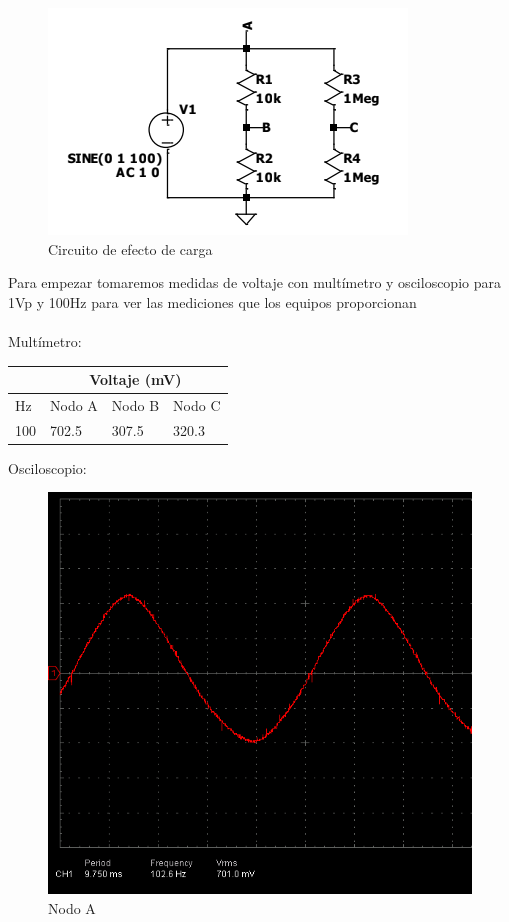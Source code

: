 \begin{figure}[H]
    \centering
    \includegraphics[scale=0.65]{img/circ/Circuito para efecto de carga.png}
    \caption{Circuito de efecto de carga}
    \label{Circuito de efecto de carga}
\end{figure}

Para empezar tomaremos medidas de voltaje con multímetro y osciloscopio para 1Vp y 100Hz para ver las mediciones que los equipos proporcionan
\\
\\
Multímetro:
\begin{table}[H]
\centering
\begin{tabular}{l|cll|}
\cline{2-4}
                          & \multicolumn{3}{c|}{Voltaje (mV)}                                  \\ \hline
\multicolumn{1}{|l|}{Hz}  & \multicolumn{1}{c|}{Nodo A} & \multicolumn{1}{l|}{Nodo B} & Nodo C \\ \hline
\multicolumn{1}{|l|}{100} & \multicolumn{1}{l|}{702.5}  & \multicolumn{1}{l|}{307.5}  & 320.3  \\ \hline
\end{tabular}
\end{table}
Osciloscopio:

\begin{figure}[H]
    \centering
    \includegraphics[scale=0.5]{img/Osci/Nodo A 100Hz.png}
    \caption{Nodo A}
    \label{Nodo A}
\end{figure}

